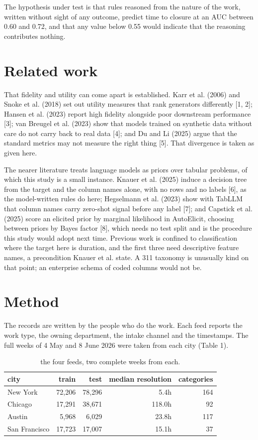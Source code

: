 \documentclass[10pt,a4paper,twocolumn]{article}
\begin{document}
The hypothesis under test is that rules reasoned from the nature of the work,
written without sight of any outcome, predict time to closure at an AUC between
0.60 and 0.72, and that any value below 0.55 would indicate that the reasoning
contributes nothing.

\section*{Related work}

That fidelity and utility can come apart is established. Karr et al. (2006) and
Snoke et al. (2018) set out utility measures that rank generators differently
[1, 2]; Hansen et al. (2023) report high fidelity alongside poor downstream
performance [3]; van Breugel et al. (2023) show that models trained on synthetic
data without care do not carry back to real data [4]; and Du and Li (2025) argue
that the standard metrics may not measure the right thing [5]. That divergence
is taken as given here.

The nearer literature treats language models as priors over tabular problems, of
which this study is a small instance. Knauer et al. (2025) induce a decision
tree from the target and the column names alone, with no rows and no labels [6],
as the model-written rules do here; Hegselmann et al. (2023) show with TabLLM
that column names carry zero-shot signal before any label [7]; and Capstick et
al. (2025) score an elicited prior by marginal likelihood in AutoElicit,
choosing between priors by Bayes factor [8], which needs no test split and is
the procedure this study would adopt next time. Previous work is confined to
classification where the target here is duration, and the first three need
descriptive feature names, a precondition Knauer et al. state. A 311 taxonomy is
unusually kind on that point; an enterprise schema of coded columns would not
be.

\section*{Method}

The records are written by the people who do the work. Each feed reports the
work type, the owning department, the intake channel and the timestamps. The
full weeks of 4 May and 8 June 2026 were taken from each city (Table 1).

\begin{table}[t]
\centering
\footnotesize
\begin{tabular}{lrrrr}
\toprule
city & train & test & median resolution & categories \\
\midrule
New York & 72,206 & 78,296 & 5.4h & 164 \\
Chicago & 17,291 & 38,671 & 118.0h & 92 \\
Austin & 5,968 & 6,029 & 23.8h & 117 \\
San Francisco & 17,723 & 17,007 & 15.1h & 37 \\
\bottomrule
\end{tabular}
\caption{the four feeds, two complete weeks from each.}
\end{table}
\end{document}
